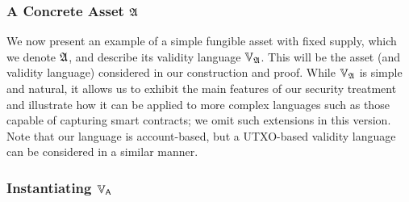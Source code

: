 \subsubsection{A Concrete Asset $\mathfrak{A}$}
\label{sec:inst}

We now present an example of a simple fungible asset with fixed supply, which we
denote $\mathfrak{A}$, and describe its validity language $\mathbb{V}_{\mathfrak{A}}$.
This will be the asset (and validity language) considered in our construction
and proof. While $\mathbb{V}_{\mathfrak{A}}$ is simple and natural, it
allows us to exhibit the main features of our security treatment and illustrate
how  it can be applied to more complex languages such as those capable
of capturing smart contracts; we omit such extensions in this version.
Note that our language is account-based, but a UTXO-based validity
language can be considered in a similar manner.

\subsubsection{Instantiating $\mathbb{V}_{\mathsf{A}}$}
\label{sec:inst-vallang}

